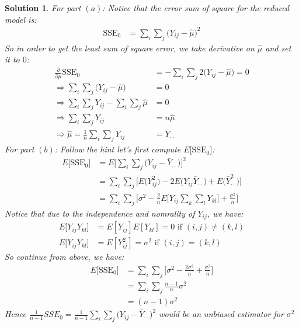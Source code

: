 \documentclass[11pt]{article}
\newtheorem{sol}{Solution}
\begin{document}
\begin{sol}
	For part $(a)$:\vskip 2mm
	Notice that the error sum of square for the reduced model is:
	\begin{align*}
		\text{SSE}_0 &= \sum_i\sum_j\Big(Y_{ij} - \hat{\mu}\Big)^2
	\end{align*}
	So in order to get the least sum of square error, we take derivative on $\hat{\mu}$ and set it to $0$:
	\begin{align*}
		\frac{\partial}{\partial \mu}\text{SSE}_0 &= -\sum_i\sum_j2\Big(Y_{ij} -\hat{\mu}\Big) = 0\\
		\Longrightarrow \sum_i\sum_j\Big(Y_{ij} - \hat{\mu}\Big) &= 0\\
		\Longrightarrow \sum_i\sum_jY_{ij} - \sum_i\sum_j \hat{\mu} &= 0\\
		\Longrightarrow \sum_i\sum_jY_{ij} &= n\hat{\mu}\\
		\Longrightarrow \hat{\mu} = \frac{1}{n}\sum_i\sum_jY_{ij} &= \bar{Y}_{\cdot\cdot}
	\end{align*}
	For part $(b)$:\vskip 2mm
	Follow the hint let's first compute $E\Big[\text{SSE}_0\Big]$:
	\begin{align*}
		E\Big[\text{SSE}_0\Big] &= E \Big[\sum_i\sum_j\Big(Y_{ij} - \bar{Y}_{\cdot\cdot}\Big)\Big]^2\\
		&= \sum_i\sum_j\Big[E\Big(Y_{ij}^2\Big) - 2E\Big(Y_{ij}\bar{Y}_{\cdot\cdot}\Big) + E\Big(\bar{Y}^2_{\cdot\cdot}\Big)\Big]\\
		&= \sum_i\sum_j \Big[\sigma^2 - \frac{2}{n}E\Big[Y_{ij}\sum_k\sum_l Y_{kl}\Big] + \frac{\sigma^2}{n}\Big]
	\end{align*}
	Notice that due to the independence and nomrality of $Y_{ij}$, we have:
	\begin{align*}
		E\Big[Y_{ij}Y_{kl}\Big] &= E[Y_{ij}]E[Y_{kl}] = 0 \text{ if }(i, j) \neq (k, l)\\
		E\Big[Y_{ij}Y_{kl}\Big] &= E[Y^2_{ij}] = \sigma^2 \text{ if }(i, j) = (k, l)
	\end{align*}
	So continue from above, we have:
	\begin{align*}
		E\Big[\text{SSE}_0\Big] &= \sum_i\sum_j\Big[\sigma^2 - \frac{2\sigma^2}{n} + \frac{\sigma^2}{n}\Big]\\
		&= \sum_i\sum_j\frac{n - 1}{n}\sigma^2\\
		&= (n - 1)\sigma^2
	\end{align*}
	Hence $\frac{1}{n - 1}SSE_0 = \frac{1}{n - 1}\sum_i\sum_j\Big(Y_{ij} - \bar{Y}_{\cdot\cdot}\Big)^2$ would be an unbiased estimator for $\sigma^2$
\end{sol}
\end{document}
